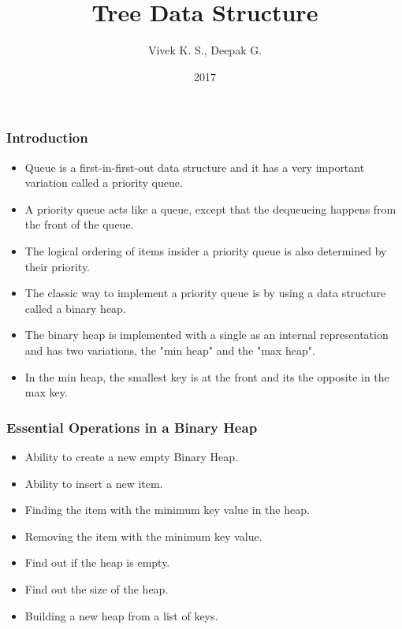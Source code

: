 \documentclass{beamer}
\title{Tree Data Structure}
\author{Vivek K. S., Deepak G.}
\institute{Information Systems Decision Sciences (ISDS)\\
MUMA College of Business\\
University of South Florida \\
Tampa, Florida}
\date{2017}
\begin{document}
 
\frame{\titlepage}
\begin{frame}
\frametitle{Introduction}
\begin{itemize}
\item Queue is a first-in-first-out data structure and it has a very important variation called a priority queue.
\item A priority queue acts like a queue, except that the dequeueing happens from the front of the queue.
\item The logical ordering of items insider a priority queue is also determined by their priority.
\item The classic way to implement a priority queue is by using a data structure called a binary heap.
\item The binary heap is implemented with a single as an internal representation and has two variations, the "min heap" and the "max heap".
\item In the min heap, the smallest key is at the front and its the opposite in the max key.
\end{itemize}
\end{frame}


\begin{frame}
\frametitle{Essential Operations in a Binary Heap}
\begin{itemize}
\item Ability to create a new empty Binary Heap.
\item Ability to insert a new item.
\item Finding the item with the minimum key value in the heap.
\item Removing the item with the minimum key value.
\item Find out if the heap is empty.
\item Find out the size of the heap.
\item Building a new heap from a list of keys.
\end{itemize}
\end{frame}
\end{document}
